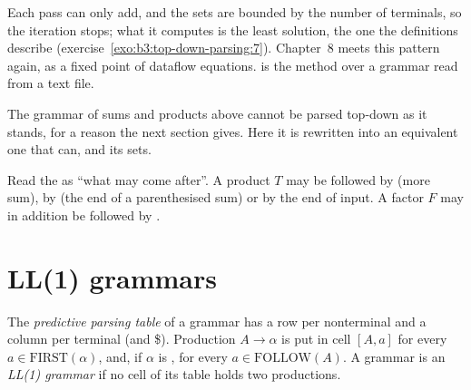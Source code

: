 Each pass can only add, and the sets are bounded by the number of terminals, so the iteration stops; what it computes is the least solution, the one the definitions describe (exercise~\ref{exo:b3:top-down-parsing:7}). Chapter~8 meets this pattern again, as a fixed point of dataflow equations.  is the method over a grammar read from a text file.

\label{lst:b3:top-down-parsing:compute}

The grammar of sums and products above cannot be parsed top-down as it stands, for a reason the next section gives. Here it is rewritten into an equivalent one that can, and its sets.

\label{lst:b3:top-down-parsing:exprgrammar}
\label{out:b3:top-down-parsing:sets}

Read the  as ``what may come after''. A product $T$ may be followed by \code{+} (more sum), by \code{)} (the end of a parenthesised sum) or by the end of input. A factor $F$ may in addition be followed by \code{*}.

\section{LL(1) grammars}\label{sec:b3:top-down-parsing:ll1}

\begin{definition}\label{def:b3:top-down-parsing:ll1}
The \emph{predictive parsing table} of a grammar has a row per nonterminal and a column per terminal (and \$). Production $A \to \alpha$ is put in cell $[A, a]$ for every $a \in \mathrm{FIRST}(\alpha)$, and, if $\alpha$ is , for every $a \in \mathrm{FOLLOW}(A)$. A grammar is an \emph{LL(1) grammar} if no cell of its table holds two productions.
\end{definition}

